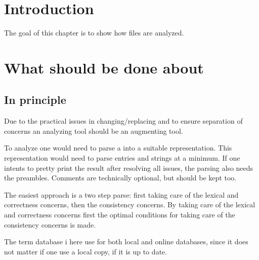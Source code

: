 

\section{Introduction}
The goal of this chapter is to show how {\bibtex} files are analyzed.


\section{What should be done about {\bibtex}}
\subsection{In principle}

Due to the practical issues in changing/replacing {\bibtex} and to
ensure separation of concerns an analyzing tool should be an
augmenting tool.

To analyze {\bibtex} one would need to parse a  into a
suitable representation.  This representation would need to parse
{\bibtex} entries and strings at a minimum.  If one intents to pretty
print the result after resolving all issues, the parsing also needs
the preambles.  Comments are technically optional, but should be kept
too.

The easiest approach is a two step parse: first taking care of the
lexical and correctness concerns, then the consistency concerns.  By
taking care of the lexical and correctness concerns first the optimal
conditions for taking care of the consistency concerns is made.

The term database i here use for both local and online databases,
since it does not matter if one use a local copy, if it is up to date.


